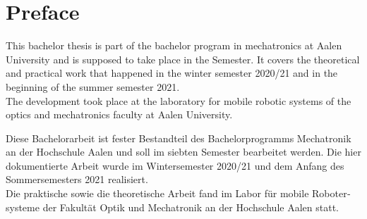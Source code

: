 \chapter*{Preface}
\label{preface}

This bachelor thesis is part of the bachelor program in mechatronics at Aalen University and is supposed to take place in the  Semester. It covers the theoretical and practical work that happened in the winter semester 2020/21 and in the beginning of the summer semester 2021.\\

The development took place at the laboratory for mobile robotic systems of the optics and mechatronics faculty at Aalen University.

\vspace*{25mm}

\begin{otherlanguage}{ngerman}
Diese Bachelorarbeit ist fester Bestandteil des Bachelorprogramms Mechatronik an der Hochschule Aalen und soll im siebten Semester bearbeitet werden. Die hier dokumentierte Arbeit wurde im Wintersemester 2020/21 und dem Anfang des Sommersemesters 2021 realisiert.\\

Die praktische sowie die theoretische Arbeit fand im Labor für mobile Robotersysteme der Fakultät Optik und Mechatronik an der Hochschule Aalen statt.
\end{otherlanguage}